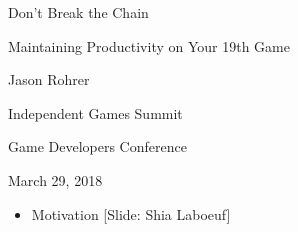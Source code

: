 \documentclass[12pt]{article}
\begin{document}
\begin{center}
Don't Break the Chain

Maintaining Productivity on Your 19th Game 

Jason Rohrer

Independent Games Summit

Game Developers Conference 

March 29, 2018
\end{center}


{\Huge



\begin{itemize}

\item Motivation [Slide:  Shia Laboeuf]


\end{itemize}

}
\end{document}
